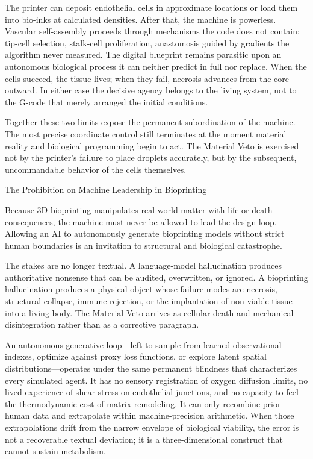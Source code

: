 The printer can deposit endothelial cells in approximate locations or load them into bio-inks at calculated densities. After that, the machine is powerless. Vascular self-assembly proceeds through mechanisms the code does not contain: tip-cell selection, stalk-cell proliferation, anastomosis guided by gradients the algorithm never measured. The digital blueprint remains parasitic upon an autonomous biological process it can neither predict in full nor replace. When the cells succeed, the tissue lives; when they fail, necrosis advances from the core outward. In either case the decisive agency belongs to the living system, not to the G-code that merely arranged the initial conditions.

Together these two limits expose the permanent subordination of the machine. The most precise coordinate control still terminates at the moment material reality and biological programming begin to act. The Material Veto is exercised not by the printer’s failure to place droplets accurately, but by the subsequent, uncommandable behavior of the cells themselves.

The Prohibition on Machine Leadership in Bioprinting

Because 3D bioprinting manipulates real-world matter with life-or-death consequences, the machine must never be allowed to lead the design loop. Allowing an AI to autonomously generate bioprinting models without strict human boundaries is an invitation to structural and biological catastrophe.

The stakes are no longer textual. A language-model hallucination produces authoritative nonsense that can be audited, overwritten, or ignored. A bioprinting hallucination produces a physical object whose failure modes are necrosis, structural collapse, immune rejection, or the implantation of non-viable tissue into a living body. The Material Veto arrives as cellular death and mechanical disintegration rather than as a corrective paragraph.

An autonomous generative loop—left to sample from learned observational indexes, optimize against proxy loss functions, or explore latent spatial distributions—operates under the same permanent blindness that characterizes every simulated agent. It has no sensory registration of oxygen diffusion limits, no lived experience of shear stress on endothelial junctions, and no capacity to feel the thermodynamic cost of matrix remodeling. It can only recombine prior human data and extrapolate within machine-precision arithmetic. When those extrapolations drift from the narrow envelope of biological viability, the error is not a recoverable textual deviation; it is a three-dimensional construct that cannot sustain metabolism.

